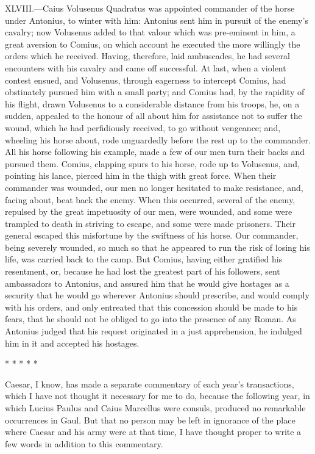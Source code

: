 XLVIII.—Caius Volusenus Quadratus was appointed commander of the horse
under Antonius, to winter with him: Antonius sent him in pursuit of the
enemy's cavalry; now Volusenus added to that valour which was pre-eminent
in him, a great aversion to Comius, on which account he executed
the more willingly the orders which he received. Having, therefore, laid
ambuscades, he had several encounters with his cavalry and came off
successful. At last, when a violent contest ensued, and Volusenus,
through eagerness to intercept Comius, had obstinately pursued him with
a small party; and Comius had, by the rapidity of his flight, drawn
Volusenus to a considerable distance from his troops, he, on a sudden,
appealed to the honour of all about him for assistance not to suffer the
wound, which he had perfidiously received, to go without vengeance; and,
wheeling his horse about, rode unguardedly before the rest up to the
commander. All his horse following his example, made a few of our men
turn their backs and pursued them. Comius, clapping spurs to his horse,
rode up to Volusenus, and, pointing his lance, pierced him in the thigh
with great force. When their commander was wounded, our men no longer
hesitated to make resistance, and, facing about, beat back the enemy.
When this occurred, several of the enemy, repulsed by the great
impetuosity of our men, were wounded, and some were trampled to death in
striving to escape, and some were made prisoners. Their general escaped
this misfortune by the swiftness of his horse. Our commander, being
severely wounded, so much so that he appeared to run the risk of losing
his life, was carried back to the camp. But Comius, having either
gratified his resentment, or, because he had lost the greatest part of
his followers, sent ambassadors to Antonius, and assured him that he
would give hostages as a security that he would go wherever Antonius
should prescribe, and would comply with his orders, and only entreated
that this concession should be made to his fears, that he should not be
obliged to go into the presence of any Roman. As Antonius judged that
his request originated in a just apprehension, he indulged him in it and
accepted his hostages.

* * * * *

Caesar, I know, has made a separate commentary of each year's
transactions, which I have not thought it necessary for me to do,
because the following year, in which Lucius Paulus and Caius Marcellus
were consuls, produced no remarkable occurrences in Gaul. But that no
person may be left in ignorance of the place where Caesar and his army
were at that time, I have thought proper to write a few words in
addition to this commentary.

